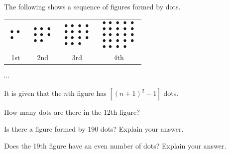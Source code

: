  The following shows a sequence of figures formed by dots.

\begin{center}
\small
\begin{tabular}{cccc}
$\substack{\bullet\ \bullet \\ \bullet\ \phantom{\bullet}}$ &
$\substack{\bullet\ \bullet\ \bullet \\ \bullet\ \bullet\ \bullet \\ \bullet\ \bullet\ \phantom{\bullet}}$ &
$\substack{\bullet\ \bullet\ \bullet\ \bullet \\ \bullet\ \bullet\ \bullet\ \bullet \\ \bullet\ \bullet\ \bullet\ \bullet \\ \bullet\ \bullet\ \bullet\ \phantom{\bullet}}$ &
$\substack{\bullet\ \bullet\ \bullet\ \bullet\ \bullet \\ \bullet\ \bullet\ \bullet\ \bullet\ \bullet \\ \bullet\ \bullet\ \bullet\ \bullet\ \bullet \\ \bullet\ \bullet\ \bullet\ \bullet\ \bullet \\ \bullet\ \bullet\ \bullet\ \bullet\ \phantom{\bullet}}$ \\
1st & 2nd & 3rd & 4th \\
\end{tabular}
\qquad $\cdots$
\end{center}

It is given that the $n$th figure has $[(n+1)^2-1]$ dots.

\begin{subparts}
  \item How many dots are there in the 12th figure?
  \item Is there a figure formed by $190$ dots? Explain your answer.
  \item Does the 19th figure have an even number of dots? Explain your answer.
\end{subparts}

